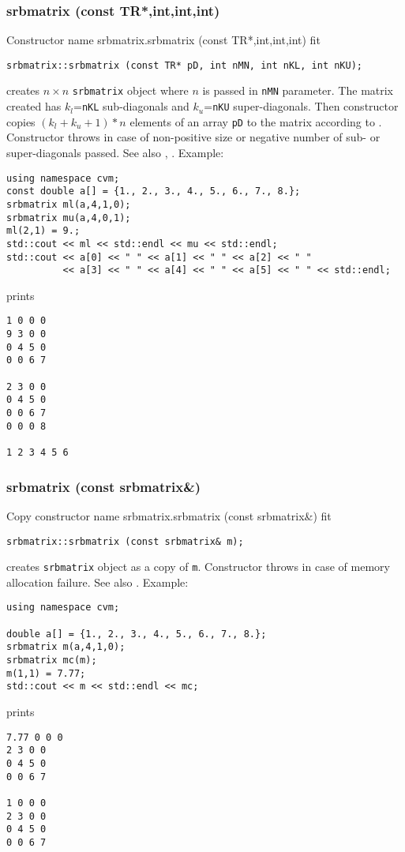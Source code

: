 \subsubsection{srbmatrix (const TR*,int,int,int)}
Constructor%
\pdfdest name {srbmatrix.srbmatrix (const TR*,int,int,int)} fit
\begin{verbatim}
srbmatrix::srbmatrix (const TR* pD, int nMN, int nKL, int nKU);
\end{verbatim}
creates  $n\times n$ \verb"srbmatrix" object where $n$ is passed in
\verb"nMN" parameter. The matrix created has $k_l$=\verb"nKL"
sub-diagonals and $k_u$=\verb"nKU" super-diagonals.
Then constructor copies $(k_l + k_u + 1)*n$ elements of an array  \verb"pD" to the 
matrix according to .
Constructor throws  
in case of non-positive size or negative number of sub- or super-diagonals 
passed.
See also ,
.
Example:
\begin{Verbatim}
using namespace cvm;
const double a[] = {1., 2., 3., 4., 5., 6., 7., 8.};
srbmatrix ml(a,4,1,0);
srbmatrix mu(a,4,0,1);
ml(2,1) = 9.;
std::cout << ml << std::endl << mu << std::endl;
std::cout << a[0] << " " << a[1] << " " << a[2] << " "
          << a[3] << " " << a[4] << " " << a[5] << " " << std::endl;
\end{Verbatim}
prints
\begin{Verbatim}
1 0 0 0
9 3 0 0
0 4 5 0
0 0 6 7

2 3 0 0
0 4 5 0
0 0 6 7
0 0 0 8

1 2 3 4 5 6
\end{Verbatim}
\newpage


\subsubsection{srbmatrix (const srbmatrix\&)}
Copy constructor%
\pdfdest name {srbmatrix.srbmatrix (const srbmatrix&)} fit
\begin{verbatim}
srbmatrix::srbmatrix (const srbmatrix& m);
\end{verbatim}
creates  \verb"srbmatrix" object as a copy of \verb"m".
Constructor throws  
in case of memory allocation failure.
See also .
Example:
\begin{Verbatim}
using namespace cvm;

double a[] = {1., 2., 3., 4., 5., 6., 7., 8.};
srbmatrix m(a,4,1,0);
srbmatrix mc(m);
m(1,1) = 7.77;
std::cout << m << std::endl << mc;
\end{Verbatim}
prints
\begin{Verbatim}
7.77 0 0 0
2 3 0 0
0 4 5 0
0 0 6 7

1 0 0 0
2 3 0 0
0 4 5 0
0 0 6 7
\end{Verbatim}
\newpage



